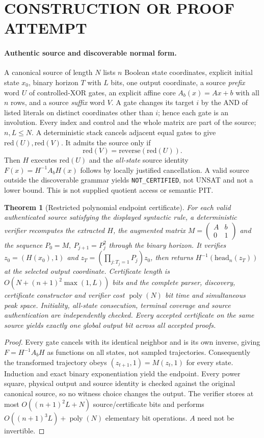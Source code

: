 \documentclass[11pt]{article}
\newtheorem{theorem}{Theorem}
\begin{document}
\section{CONSTRUCTION OR PROOF ATTEMPT}
\paragraph{Authentic source and discoverable normal form.}
A canonical source of length $N$ lists $n$ Boolean state coordinates, explicit initial state $x_0$, binary horizon $T$ with $L$ bits, one output coordinate, a source \emph{prefix} word $U$ of controlled-XOR gates, an explicit affine core $A_b(x)=Ax+b$ with all $n$ rows, and a source \emph{suffix} word $V$. A gate changes its target $i$ by the AND of listed literals on distinct coordinates other than $i$; hence each gate is an involution. Every index and control and the whole matrix are part of the source; $n,L\le N$. A deterministic stack cancels adjacent equal gates to give $\mathrm{red}(U),\mathrm{red}(V)$. It admits the source only if
\[
\mathrm{red}(V)=\mathrm{reverse}(\mathrm{red}(U)).
\]
Then $H$ executes $\mathrm{red}(U)$ and the \emph{all-state} source identity $F(x)=H^{-1}A_bH(x)$ follows by locally justified cancellation. A valid source outside the discoverable grammar yields \texttt{NOT\_CERTIFIED}, not UNSAT and not a lower bound. This is not supplied quotient access or semantic PIT.

\begin{theorem}[Restricted polynomial endpoint certificate]
For each valid authenticated source satisfying the displayed syntactic rule, a deterministic verifier recomputes the extracted $H$, the augmented matrix $M=\left(\begin{smallmatrix} A&b\\0&1\end{smallmatrix}\right)$ and the sequence $P_0=M,\ P_{j+1}=P_j^2$ through the binary horizon. It verifies $z_0=(H(x_0),1)$ and $z_T=(\prod_{j:T_j=1}P_j)z_0$, then returns $H^{-1}(\mathrm{head}_n(z_T))$ at the selected output coordinate. Certificate length is $O(N+(n+1)^2\max(1,L))$ bits and the complete parser, discovery, certificate constructor and verifier cost $\operatorname{poly}(N)$ bit time and simultaneous peak space. Initiality, all-state consecution, terminal coverage and source authentication are independently checked. Every accepted certificate on the same source yields \emph{exactly one global output bit} across all accepted proofs.
\end{theorem}
\begin{proof}
Every gate cancels with its identical neighbor and is its own inverse, giving $F=H^{-1}A_bH$ as functions on all states, not sampled trajectories. Consequently the transformed trajectory obeys $(z_{t+1},1)=M(z_t,1)$ for every state. Induction and exact binary exponentiation yield the endpoint. Every power square, physical output and source identity is checked against the original canonical source, so no witness choice changes the output. The verifier stores at most $O((n+1)^2L+N)$ source/certificate bits and performs $O((n+1)^3L)+\operatorname{poly}(N)$ elementary bit operations. $A$ need not be invertible.
\end{proof}
\end{document}
